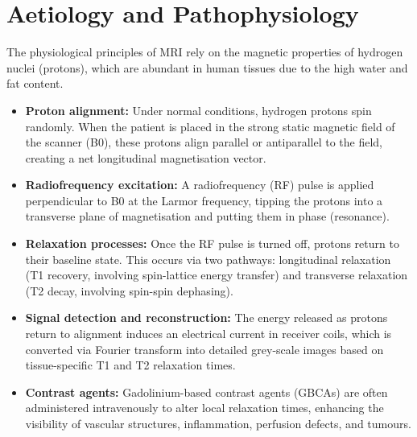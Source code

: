 \section*{Aetiology and Pathophysiology}
The physiological principles of MRI rely on the magnetic properties of hydrogen nuclei (protons), which are abundant in human tissues due to the high water and fat content.
\begin{itemize}
    \item \textbf{Proton alignment:} Under normal conditions, hydrogen protons spin randomly. When the patient is placed in the strong static magnetic field of the scanner (B0), these protons align parallel or antiparallel to the field, creating a net longitudinal magnetisation vector.
    \item \textbf{Radiofrequency excitation:} A radiofrequency (RF) pulse is applied perpendicular to B0 at the Larmor frequency, tipping the protons into a transverse plane of magnetisation and putting them in phase (resonance).
    \item \textbf{Relaxation processes:} Once the RF pulse is turned off, protons return to their baseline state. This occurs via two pathways: longitudinal relaxation (T1 recovery, involving spin-lattice energy transfer) and transverse relaxation (T2 decay, involving spin-spin dephasing).
    \item \textbf{Signal detection and reconstruction:} The energy released as protons return to alignment induces an electrical current in receiver coils, which is converted via Fourier transform into detailed grey-scale images based on tissue-specific T1 and T2 relaxation times.
    \item \textbf{Contrast agents:} Gadolinium-based contrast agents (GBCAs) are often administered intravenously to alter local relaxation times, enhancing the visibility of vascular structures, inflammation, perfusion defects, and tumours.
\end{itemize}

